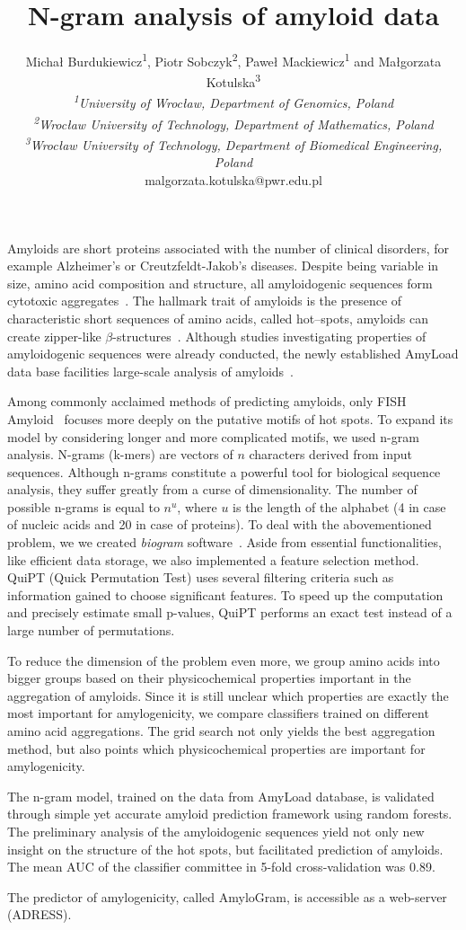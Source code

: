 \documentclass[english]{gcb15abstract}
\title{N-gram analysis of amyloid data}
\author{
Micha\l{} Burdukiewicz\textsuperscript{1}, Piotr Sobczyk\textsuperscript{2}, Pawe\l{} Mackiewicz\textsuperscript{1} and Ma\l{}gorzata Kotulska\textsuperscript{3} \\
{\normalsize\normalfont\itshape \textsuperscript{1}University of Wroc\l{}aw, Department of Genomics, Poland}\\
{\normalsize\normalfont\itshape \textsuperscript{2}Wroc\l{}aw University of Technology, Department of Mathematics, Poland}\\
{\normalsize\normalfont\itshape \textsuperscript{3}Wroc\l{}aw University of Technology, Department of Biomedical Engineering, Poland}\\
malgorzata.kotulska@pwr.edu.pl
}
\begin{document}
\maketitle 

Amyloids are short proteins associated with the number of clinical disorders, for example Alzheimer's or Creutzfeldt-Jakob’s diseases. Despite being variable in size, amino acid composition and structure, all amyloidogenic sequences form cytotoxic aggregates~\cite{breydo_structural_2015}. The hallmark trait of amyloids is the presence of characteristic short sequences of amino acids, called hot--spots, amyloids can create zipper\mbox{-}\nobreak\hspace{0pt}like $\beta$\mbox{-}\nobreak\hspace{0pt}structures~\cite{fandrich_oligomeric_2012}. Although studies investigating properties of amyloidogenic sequences were already conducted, the newly established AmyLoad data base facilities large-scale analysis of amyloids~\cite{wozniak_amyload:_2015}.

Among commonly acclaimed methods of predicting amyloids, only FISH Amyloid~\cite{gasior_fish_2014} focuses more deeply on the putative motifs of hot spots. To expand its model by considering longer and more complicated motifs, we used n-gram analysis. N-grams (k-mers) are vectors of $n$ characters derived from input sequences. Although n-grams constitute a powerful tool for biological sequence analysis, they suffer greatly from a curse of dimensionality. The number of possible n-grams is equal to $n^u$, where $u$ is the length of the alphabet (4 in case of nucleic acids and 20 in case of proteins). To deal with the abovementioned problem, we we created \textit{biogram} software~\cite{burdukiewicz_biogram:_2015}. Aside from essential  functionalities, like efficient data storage, we also implemented a feature selection method. QuiPT (Quick Permutation Test) uses several filtering criteria such as information gained to choose significant features. To speed up the computation and precisely estimate small p-values, QuiPT performs an exact test instead of a large number of permutations. 

To reduce the dimension of the problem even more, we group amino acids into bigger groups based on their physicochemical properties important in the aggregation of amyloids. Since it is still unclear which properties are exactly the most important for amylogenicity, we compare classifiers trained on different amino acid aggregations. The grid search not only yields the best aggregation method, but also points which physicochemical properties are important for amylogenicity. 

The n-gram model, trained on the data from AmyLoad database, is validated through simple yet accurate amyloid prediction framework using random forests. The preliminary analysis of the amyloidogenic sequences yield not only new insight on the structure of the hot spots, but facilitated prediction of amyloids. The mean AUC of the classifier committee in 5-fold cross‑validation was 0.89.

The predictor of amylogenicity, called AmyloGram, is accessible as a web-server (ADRESS).


\end{document}
